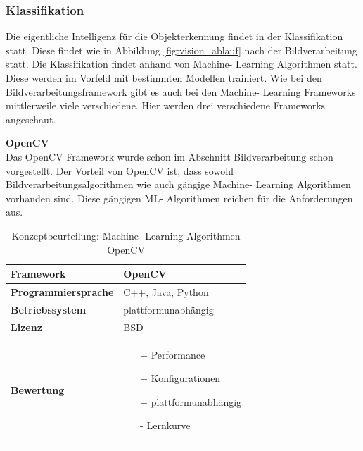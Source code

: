 \documentclass[../../../main.tex]{subfiles}
\begin{document}
        \vspace{0.5cm}
        \subsubsection{Klassifikation}
        Die eigentliche Intelligenz für die Objekterkennung findet in der Klassifikation statt. Diese findet wie in Abbildung \ref{fig:vision_ablauf} nach der Bildverarbeitung statt. Die Klassifikation findet anhand von Machine- Learning Algorithmen statt. Diese werden im Vorfeld mit bestimmten Modellen trainiert. Wie bei den Bildverarbeitungsframework gibt es auch bei den Machine- Learning Frameworks mittlerweile viele verschiedene. Hier werden drei verschiedene Frameworks angeschaut.\\
        \pagebreak


        \textbf{OpenCV}\\
        Das OpenCV Framework wurde schon im Abschnitt Bildverarbeitung schon vorgestellt. Der Vorteil von OpenCV ist, dass sowohl Bildverarbeitungsalgorithmen wie auch gängige Machine- Learning Algorithmen vorhanden sind. Diese gängigen ML- Algorithmen reichen für die Anforderungen aus.
        \begin{flushleft}
            \begin{table}[h]
            \begin{tabular}{ | l | p{11cm} |}
            \hline
            \textbf{Framework} & OpenCV \\ \hline
            \textbf{Programmiersprache} & C++, Java, Python \\ \hline
            \textbf{Betriebssystem} & plattformunabhängig \\ \hline
            \textbf{Lizenz} & BSD \\ \hline
            \textbf{Bewertung} &  \begin{itemize}
                                    \item[+] Performance
                                    \item[+] Konfigurationen
                                    \item[+] plattformunabhängig 
                                    \item[-] Lernkurve
                                  \end{itemize} \\ \hline
            \end{tabular}
            \caption{Konzeptbeurteilung: Machine- Learning Algorithmen OpenCV}
            \label{tab:konzept_ML_OpenCV}
            \end{table}
        \end{flushleft}
        \vspace{1cm}
\end{document}
